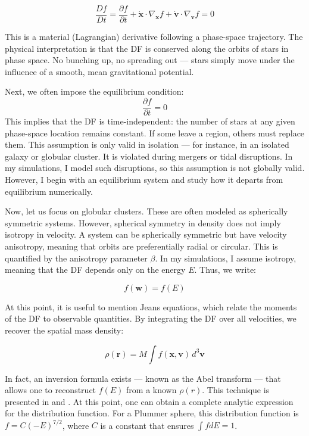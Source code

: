         \begin{equation}
        \frac{Df}{Dt} = \frac{\partial f}{\partial t} + \dot{\mathbf{x}} \cdot \nabla_{\mathbf{x}} f + \dot{\mathbf{v}} \cdot \nabla_{\mathbf{v}} f = 0
        \end{equation}

        This is a material (Lagrangian) derivative following a phase-space trajectory. The physical interpretation is that the DF is conserved along the orbits of stars in phase space. No bunching up, no spreading out — stars simply move under the influence of a smooth, mean gravitational potential.

        Next, we often impose the equilibrium condition:
        \[
        \frac{\partial f}{\partial t} = 0
        \]
        This implies that the DF is time-independent: the number of stars at any given phase-space location remains constant. If some leave a region, others must replace them. This assumption is only valid in isolation — for instance, in an isolated galaxy or globular cluster. It is violated during mergers or tidal disruptions. In my simulations, I model such disruptions, so this assumption is not globally valid. However, I begin with an equilibrium system and study how it departs from equilibrium numerically.

        Now, let us focus on globular clusters. These are often modeled as spherically symmetric systems. However, spherical symmetry in density does not imply isotropy in velocity. A system can be spherically symmetric but have velocity anisotropy, meaning that orbits are preferentially radial or circular. This is quantified by the anisotropy parameter \( \beta \). In my simulations, I assume isotropy, meaning that the DF depends only on the energy \( E \). Thus, we write:

        \[
        f(\mathbf{w}) = f(E)
        \]

        At this point, it is useful to mention Jeans equations, which relate the moments of the DF to observable quantities. By integrating the DF over all velocities, we recover the spatial mass density:

        \[
        \rho(\mathbf{r}) = M \int f(\mathbf{x}, \mathbf{v}) \, d^3\mathbf{v}
        \]

        In fact, an inversion formula exists — known as the Abel transform — that allows one to reconstruct \( f(E) \) from a known \( \rho(r) \). This technique is presented in \citet{2008gady.book.....B} and \citet{bovy_inprep}. At this point, one can obtain a complete analytic expression for the distribution function. For a Plummer sphere, this distribution function is $f = C (-E)^{7/2}$, where $C$ is a constant that ensures $\int f dE =1$. 


